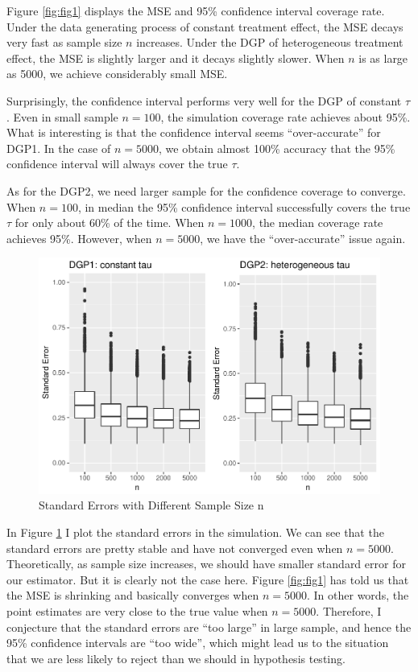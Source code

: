 \documentclass[]{article}
\begin{document}
Figure \ref{fig:fig1} displays the MSE and 95\% confidence interval
coverage rate. Under the data generating process of constant treatment
effect, the MSE decays very fast as sample size \(n\) increases. Under
the DGP of heterogeneous treatment effect, the MSE is slightly larger
and it decays slightly slower. When \(n\) is as large as 5000, we
achieve considerably small MSE.

Surprisingly, the confidence interval performs very well for the DGP of
constant \(\tau\). Even in small sample \(n=100\), the simulation
coverage rate achieves about 95\%. What is interesting is that the
confidence interval seems ``over-accurate'' for DGP1. In the case of
\(n=5000\), we obtain almost 100\% accuracy that the 95\% confidence
interval will always cover the true \(\tau\).

As for the DGP2, we need larger sample for the confidence coverage to
converge. When \(n=100\), in median the 95\% confidence interval
successfully covers the true \(\tau\) for only about 60\% of the time.
When \(n=1000\), the median coverage rate achieves 95\%. However, when
\(n=5000\), we have the ``over-accurate'' issue again.

\begin{figure}
\centering
\includegraphics{report_files/figure-latex/fig2-1.pdf}
\caption{\label{fig:fig2}Standard Errors with Different Sample Size n}
\end{figure}

In Figure \ref{fig:fig2} I plot the standard errors in the simulation.
We can see that the standard errors are pretty stable and have not
converged even when \(n=5000\). Theoretically, as sample size increases,
we should have smaller standard error for our estimator. But it is
clearly not the case here. Figure \ref{fig:fig1} has told us that the
MSE is shrinking and basically converges when \(n=5000\). In other
words, the point estimates are very close to the true value when
\(n=5000\). Therefore, I conjecture that the standard errors are ``too
large'' in large sample, and hence the 95\% confidence intervals are
``too wide'', which might lead us to the situation that we are less
likely to reject than we should in hypothesis testing.
\end{document}
